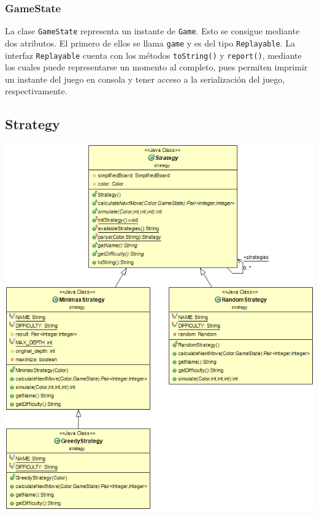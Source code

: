 \documentclass[../DocumentoOficial.tex]{subfiles}
\begin{document}
\subsubsection{GameState}

La clase \texttt{GameState} representa un instante de \texttt{Game}. Esto se consigue mediante dos atributos. El primero de ellos se llama \texttt{game} y es del tipo \texttt{Replayable}. La interfaz \texttt{Replayable} cuenta con los métodos \texttt{toString()} y \texttt{report()}, mediante los cuales puede representarse un momento al completo, pues permiten imprimir un instante del juego en consola y tener acceso a la serialización del juego, respectivamente.

\subsection{Strategy}

\label{subsec:Strategy}

\begin{center}
\includegraphics[scale=0.75]{Strategy-sprint7.png} 
\end{center}
\end{document}
